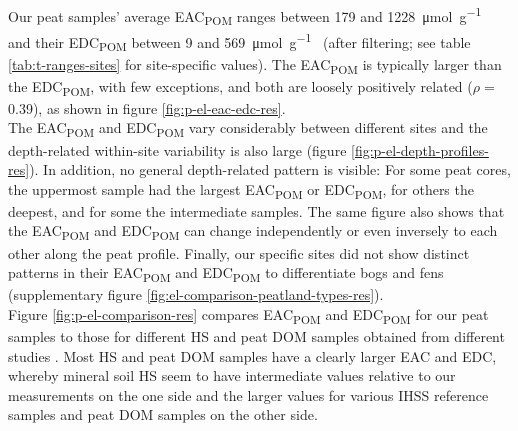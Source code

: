 \documentclass[alpha-refs]{wiley-article-rmd}
\begin{document}
\begin{refsection}
Our peat samples' average EAC\textsubscript{POM} ranges between 179 and \SI{1228}{\micro\mol\per\g\carbon} and their EDC\textsubscript{POM} between 9 and \SI{569}{\micro\mol\per\g\carbon} (after filtering; see table \ref{tab:t-ranges-sites} for site-specific values). The EAC\textsubscript{POM} is typically larger than the EDC\textsubscript{POM}, with few exceptions, and both are loosely positively related (\(\rho=\) 0.39), as shown in figure \ref{fig:p-el-eac-edc-res}.\\
The EAC\textsubscript{POM} and EDC\textsubscript{POM} vary considerably between different sites and the depth-related within-site variability is also large (figure \ref{fig:p-el-depth-profiles-res}). In addition, no general depth-related pattern is visible: For some peat cores, the uppermost sample had the largest EAC\textsubscript{POM} or EDC\textsubscript{POM}, for others the deepest, and for some the intermediate samples. The same figure also shows that the EAC\textsubscript{POM} and EDC\textsubscript{POM} can change independently or even inversely to each other along the peat profile. Finally, our specific sites did not show distinct patterns in their EAC\textsubscript{POM} and EDC\textsubscript{POM} to differentiate bogs and fens (supplementary figure \ref{fig:el-comparison-peatland-types-res}).\\
Figure \ref{fig:p-el-comparison-res} compares EAC\textsubscript{POM} and EDC\textsubscript{POM} for our peat samples to those for different HS and peat DOM samples obtained from different studies \autocite{Aeschbacher.2012,Tan.2017,Walpen.2018}. Most HS and peat DOM samples have a clearly larger EAC and EDC, whereby mineral soil HS \autocite{Tan.2017} seem to have intermediate values relative to our measurements on the one side and the larger values for various IHSS reference samples \autocite{Aeschbacher.2012} and peat DOM samples \autocite{Walpen.2018} on the other side.

\begin{landscape}\begin{table}


\end{table}
\end{landscape}
\end{refsection}
\end{document}
